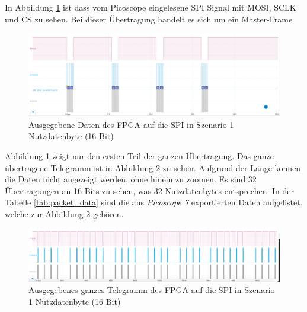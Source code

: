 In Abbildung \ref{fig:ResultatFPGANoBuff} ist dass vom Picoscope eingelesene SPI Signal mit MOSI, SCLK und CS zu sehen. Bei dieser Übertragung handelt es sich um ein Master-Frame.


\begin{figure}[H]
    \centering
    \includegraphics[width=1\linewidth]{Figures/Chap4/FPGA/Test_FPGA_noBuff_signal.png}
    \caption{Ausgegebene Daten des FPGA auf die SPI in Szenario 1 Nutzdatenbyte (16 Bit)}
    \label{fig:ResultatFPGANoBuff}
\end{figure}

Abbildung \ref{fig:ResultatFPGANoBuff} zeigt nur den ersten Teil der ganzen Übertragung. Das ganze übertragene Telegramm ist in Abbildung \ref{fig:ResultatFPGANoBuffFull} zu sehen. Aufgrund der Länge können die Daten nicht angezeigt werden, ohne hinein zu zoomen.
Es sind 32 Übertragungen an 16 Bits zu sehen, was 32 Nutzdatenbytes entsprechen. In der Tabelle \ref{tab:packet_data} sind die aus \textit{Picoscope 7} exportierten Daten aufgelistet, welche zur Abbildung \ref{fig:ResultatFPGANoBuffFull} gehören.

\begin{figure}[H]
    \centering
    \includegraphics[width=1\linewidth]{Figures/Chap4/FPGA/Test_FPGA_noBuff_signal_full.png}
    \caption{Ausgegebenes ganzes Telegramm des FPGA auf die SPI in Szenario 1 Nutzdatenbyte (16 Bit)}
    \label{fig:ResultatFPGANoBuffFull}
\end{figure}

